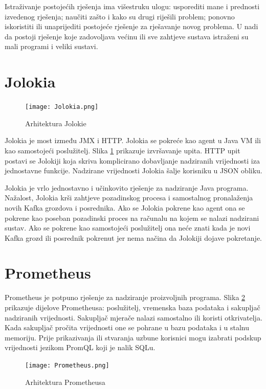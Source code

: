 \documentclass[utf8, diplomski, lmodern, numeric]{fer}
\begin{document}
Istraživanje postojećih rješenja ima višestruku ulogu: usporediti mane i prednosti izvedenog rješenja; naučiti zašto i kako su drugi riješili problem; ponovno iskoristiti ili unaprijediti postojeće rješenje za rješavanje novog problema. U nadi da postoji rješenje koje zadovoljava većinu ili sve zahtjeve sustava istraženi su mali programi i veliki sustavi.


\section{Jolokia}

\begin{figure}[H]
    \centering
    \texttt{[image: Jolokia.png]}
    \caption{Arhitektura Jolokie}
    \label{fig:jolokia}
\end{figure}

Jolokia \citep{jolokia} je most između JMX i HTTP. Jolokia se pokreće kao agent u Java VM ili kao samostojeći poslužitelj. Slika \ref{fig:jolokia} prikazuje izvršavanje upita. HTTP upit postavi se Jolokiji koja skriva komplicirano dobavljanje nadziranih vrijednosti iza jednostavne funkcije. Nadzirane vrijednosti Jolokia šalje korisniku u JSON obliku.

Jolokia je vrlo jednostavno i učinkovito rješenje za nadziranje Java programa. Nažalost, Jolokia krši zahtjeve pozadinskog procesa i samostalnog pronalaženja novih Kafka grozdova i posrednika. Ako se Jolokia pokrene kao agent ona se pokrene kao poseban pozadinski proces na računalu na kojem se nalazi nadzirani sustav. Ako se pokrene kao samostojeći poslužitelj ona neće znati kada je novi Kafka grozd ili posrednik pokrenut jer nema načina da Jolokiji dojave pokretanje.


\section{Prometheus}

Prometheus \citep{prometheus} je potpuno rješenje za nadziranje proizvoljnih programa. Slika \ref{fig:prometheus} prikazuje dijelove Prometheusa: poslužitelj, vremenska baza podataka i sakupljač nadziranih vrijednosti. Sakupljač mjerače nalazi samostalno ili koristi otkrivatelja. Kada sakupljač pročita vrijednosti one se pohrane u bazu podataka i u stalnu memoriju. Prije prikazivanja ili stvaranja uzbune korisnici mogu izabrati podskup vrijednosti jezikom PromQL koji je nalik SQLu.

\begin{figure}[H]
    \centering
    \texttt{[image: Prometheus.png]}
    \caption{Arhitektura Prometheusa}
    \label{fig:prometheus}
\end{figure}
\end{document}
